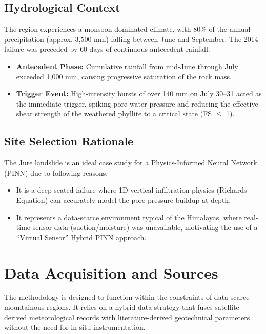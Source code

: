 \documentclass[12pt]{report}
\begin{document}
\section{Hydrological Context}

The region experiences a monsoon-dominated climate, with 80\% of the annual precipitation (approx. 3,500 mm) falling between June and September. The 2014 failure was preceded by 60 days of continuous antecedent rainfall.
\begin{itemize}
    \item \textbf{Antecedent Phase:} Cumulative rainfall from mid-June through July exceeded 1,000 mm, causing progressive saturation of the rock mass.
    
    \item \textbf{Trigger Event:} High-intensity bursts of over 140 mm on July 30--31 acted as the immediate trigger, spiking pore-water pressure and reducing the effective shear strength of the weathered phyllite to a critical state (FS $\leq$ 1).

\end{itemize}

\section{Site Selection Rationale}

The Jure landslide is an ideal case study for a Physics-Informed Neural Network (PINN) due to following reasons:

\begin{itemize}
    \item It is a deep-seated failure where 1D vertical infiltration physics (Richards Equation) can accurately model the pore-pressure buildup at depth.
    
    \item It represents a data-scarce environment typical of the Himalayas, where real-time sensor data (suction/moisture) was unavailable, motivating the use of a ``Virtual Sensor'' Hybrid PINN approach.
\end{itemize}

\chapter{Data Acquisition and Sources}

The methodology is designed to function within the constraints of
data-scarce mountainous regions. It relies on a hybrid data strategy
that fuses satellite-derived meteorological records with
literature-derived geotechnical parameters without the need for
in-situ instrumentation.
\end{document}
